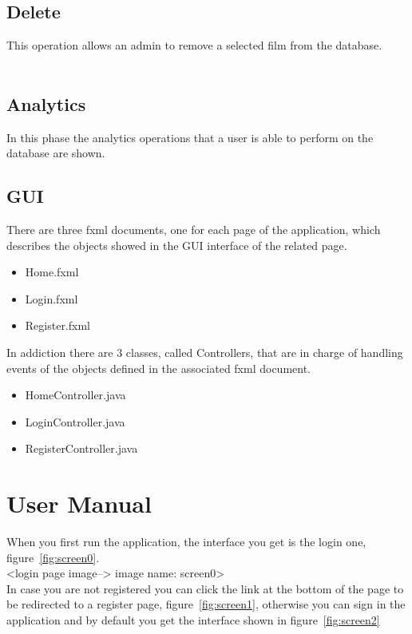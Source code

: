 \documentclass[a4paper, oneside]{article}
\begin{document}
\subsection{Delete}
This operation allows an admin to remove a selected film from the database.\\
\vspace{2mm}
\\<code here>
\vspace{5mm}

\clearpage

\subsection{Analytics}
In this phase the analytics operations that a user is able to perform on the database are shown.

\subsection{GUI}
There are three fxml documents, one for each page of the application, which describes the objects showed in the GUI interface of the related page.
\begin{itemize}
\item Home.fxml
\item Login.fxml
\item Register.fxml
\end{itemize}
In addiction there are 3 classes, called Controllers, that are in charge of handling events of the objects defined in the associated fxml document.
\begin{itemize}
\item HomeController.java
\item LoginController.java
\item RegisterController.java
\end{itemize}

\clearpage
\section{User Manual}
When you first run the application, the interface you get is the login one, figure~\ref{fig:screen0}. \\

<login page image--> image name: screen0>\\

In case you are not registered you can click the link at the bottom of the page to be redirected to a register page, figure~\ref{fig:screen1}, otherwise you can sign in the application and by default you get the interface shown in figure~\ref{fig:screen2}\\
\end{document}
